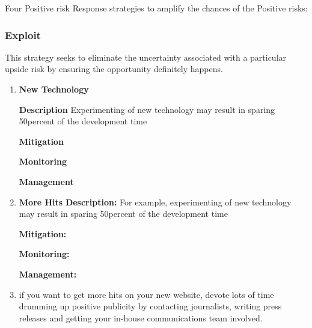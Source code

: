 \documentclass[12pt]{article}
\begin{document}
Four Positive risk Response strategies to amplify the chances of the Positive risks:

\subsubsection{Exploit}
This strategy seeks to eliminate the uncertainty associated with a particular upside risk by ensuring the opportunity definitely happens.
\begin{enumerate}
    \item
    
    \textbf{New Technology }
    
    \textbf{Description}
    Experimenting of new technology may result in sparing 50percent of the development time
    
    \bigskip
    \textbf{Mitigation}
    
    
    \bigskip
    \textbf{Monitoring}
    
    
    \bigskip
    \textbf{Management}


\item
    \textbf{More Hits }
    \textbf{Description:}
    For example, experimenting of new technology may result in sparing 50percent of the development time
    
    \bigskip
    \textbf{Mitigation:}
    
    
    \bigskip
    \textbf{Monitoring:}
    
    
    \bigskip
    \textbf{Management:}
    
    \item if you want to get more hits on your new website, devote lots of time drumming up positive publicity by contacting journalists, writing press releases and getting your in-house communications team involved.
    
\end{enumerate}
\end{document}
